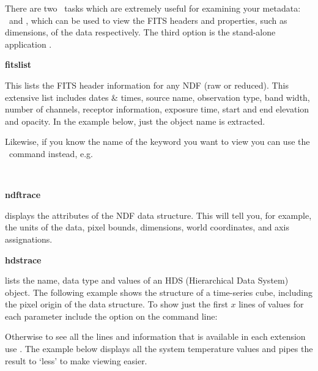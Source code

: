 \documentclass[11pt,oneside,chapters]{starlink}
\begin{document}
There are two \Kappa\ tasks which are extremely useful for examining
your metadata: \fitslist\ and \ndftrace, which can be used to view the
FITS headers and properties, such as dimensions, of the data
respectively. The third option is the stand-alone application
\hdstrace.
\vspace{0.7cm}\\
\begin{minipage}[t]{0.12\linewidth}
\textbf{fitslist}
\end{minipage}
\begin{minipage}[t]{0.85\linewidth}This lists the FITS header information
for any NDF (raw or reduced). This extensive list includes dates \&
times, source name, observation type, band width, number of channels,
receptor information, exposure time, start and end elevation and
opacity. In the example below, just the object name is extracted.
\begin{terminalv}
\end{terminalv}
Likewise, if you know the name of the keyword you want to view you can
use the \fitsval\ command instead, e.g.
\begin{terminalv}
\end{terminalv}
\end{minipage}
\vspace{0.7cm}\\
\begin{minipage}[t]{0.12\linewidth}
\textbf{ndftrace}
\end{minipage}
\begin{minipage}[t]{0.85\linewidth}
 displays the attributes of the NDF data structure.
This will tell you, for example, the units of the data, pixel bounds,
dimensions, world coordinates, and axis assignations.
\begin{terminalv}
\end{terminalv}
\end{minipage}

\begin{minipage}[t]{0.12\linewidth}
\textbf{hdstrace}
\end{minipage}
\begin{minipage}[t]{0.85\linewidth}
 lists the name, data type and values of an HDS
(Hierarchical Data System) object. The following example shows the
structure of a time-series cube, including the pixel origin of the
data structure. To show just the first $x$ lines of values for each
parameter include the option  on the command line:
\begin{terminalv}
\end{terminalv}
Otherwise to see all the lines and information that is available in
each extension use . The example below displays all
the system temperature values and pipes the result to `less' to make
viewing easier.
\begin{terminalv}
\end{terminalv}
\end{minipage}
\vspace{0.4cm}
\end{document}
